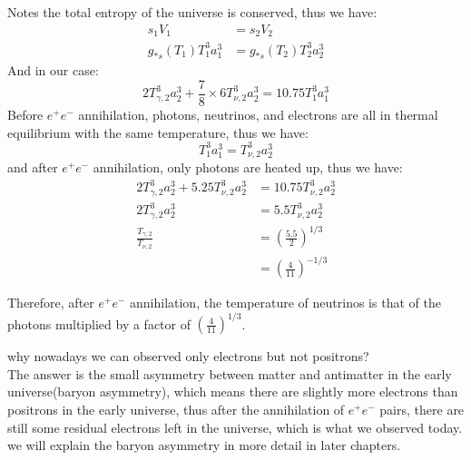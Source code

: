 \begin{theory}
    Notes the total entropy of the universe is conserved, thus we have:
    \begin{align*}
        s_\text{1} V_\text{1} &= s_\text{2} V_\text{2} \\
        g_{*s}(T_\text{1}) T_\text{1}^3 a_\text{1}^3 &= g_{*s}(T_\text{2}) T_\text{2}^3 a_\text{2}^3
    \end{align*}
    And in our case:
    \[
        2 T_{\gamma,\text{2}}^3 a_{\text{2}}^3 + \frac{7}{8} \times 6 T_{\nu,\text{2}}^3 a_{\text{2}}^3 = 10.75 T_{\text{1}}^3 a_{\text{1}}^3
    \]
    Before $e^+ e^-$ annihilation, photons, neutrinos, and electrons are all in thermal equilibrium with the same temperature, thus we have:
    \[
        T_{\text{1}}^3 a_{\text{1}}^3 = T_{\nu,\text{2}}^3 a_{\text{2}}^3
    \]
    and after $e^+ e^-$ annihilation, only photons are heated up, thus we have:
    \begin{align*}
        2 T_{\gamma,\text{2}}^3 a_{\text{2}}^3 + 5.25 T_{\nu,\text{2}}^3 a_{\text{2}}^3 &= 10.75 T_{\nu,\text{2}}^3 a_{\text{2}}^3 \\
        2 T_{\gamma,\text{2}}^3 a_{\text{2}}^3 &= 5.5 T_{\nu,\text{2}}^3 a_{\text{2}}^3 \\
        \frac{T_{\gamma,\text{2}}}{T_{\nu,\text{2}}} &= \left( \frac{5.5}{2} \right)^{1/3} \\
        &= \left( \frac{4}{11} \right)^{-1/3}
    \end{align*} 

    Therefore, after $e^+ e^-$ annihilation, the temperature of neutrinos is that of the photons multiplied by a factor of $\left( \frac{4}{11} \right)^{1/3}$.
\end{theory}

\begin{remark}
    why nowadays we can observed only electrons but not positrons? \\

    The answer is the small asymmetry between matter and antimatter in the early universe(baryon asymmetry), which means there are slightly more electrons than positrons in the early universe, thus after the annihilation of $e^+ e^-$ pairs, there are still some residual electrons left in the universe, which is what we observed today. \\

    we will explain the baryon asymmetry in more detail in later chapters.
\end{remark}




